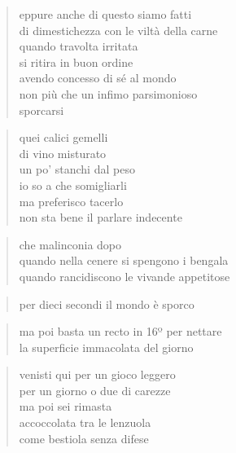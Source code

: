 	\begin{verse}
		eppure anche di questo siamo fatti\\
		di dimestichezza con le viltà della carne\\
		quando travolta irritata\\
		si ritira in buon ordine\\
		avendo concesso di sé al mondo\\
		non più che un infimo parsimonioso\\
		sporcarsi
	\end{verse}

\clearpage


	\begin{verse}
		quei calici gemelli\\
		di vino misturato\\
		un po' stanchi dal peso\\
		io so a che somigliarli\\
		ma preferisco tacerlo\\
		non sta bene il parlare indecente
	\end{verse}

\clearpage


	\begin{verse}
		che malinconia dopo\\
		quando nella cenere si spengono i bengala\\
		quando rancidiscono le vivande appetitose
	\end{verse}

	\begin{verse}
		per dieci secondi il mondo è sporco
	\end{verse}

	\begin{verse}
		ma poi basta un recto in 16º per nettare\\
		la superficie immacolata del giorno
	\end{verse}

\clearpage


	\begin{verse}
		venisti qui per un gioco leggero\\
		per un giorno o due di carezze\\
		ma poi sei rimasta\\
		accoccolata tra le lenzuola\\
		come bestiola senza difese
	\end{verse}

